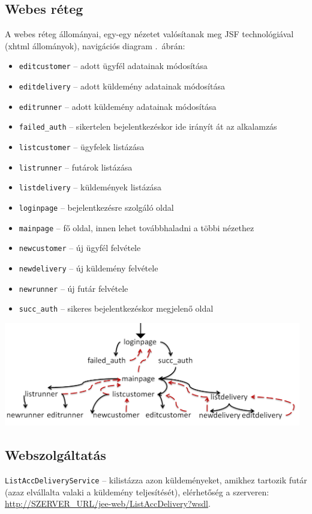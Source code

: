 \documentclass[a4paper,oneside,12pt]{article}
\begin{document}
\subsection{Webes réteg}
A webes réteg állományai, egy-egy nézetet valósítanak meg JSF technológiával
(xhtml állományok), navigációs diagram .~ábrán: 
\begin{itemize}
\item \verb+editcustomer+ -- adott ügyfél adatainak módosítása
\item \verb+editdelivery+ -- adott küldemény adatainak módosítása
\item \verb+editrunner+ -- adott küldemény adatainak módosítása
\item \verb+failed_auth+ -- sikertelen bejelentkezéskor ide irányít át az alkalamzás
\item \verb+listcustomer+ -- ügyfelek listázása
\item \verb+listrunner+ -- futárok listázása
\item \verb+listdelivery+ -- küldemények listázása
\item \verb+loginpage+ -- bejelentkezésre szolgáló oldal
\item \verb+mainpage+ -- fő oldal, innen lehet továbbhaladni a többi nézethez
\item \verb+newcustomer+ -- új ügyfél felvétele
\item \verb+newdelivery+ -- új küldemény felvétele
\item \verb+newrunner+ -- új futár felvétele
\item \verb+succ_auth+ -- sikeres bejelentkezéskor megjelenő oldal
\end{itemize}
\begin{center}
        \includegraphics[width=13cm]{nav_diag.png}
        \label{fig:nav-diag}
\end{center}

\subsection{Webszolgáltatás}
\verb+ListAccDeliveryService+ -- kilistázza azon küldeményeket, amikhez tartozik futár
(azaz elvállalta valaki a küldemény teljesítését), elérhetőség a szerveren: \url{http://SZERVER_URL/jee-web/ListAccDelivery?wsdl}.
\end{document}
